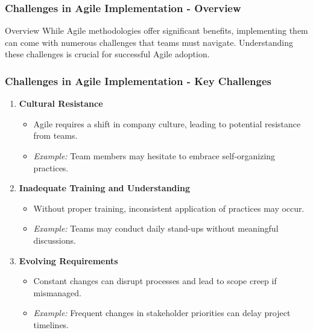 \documentclass{beamer}
\begin{document}
\begin{frame}[fragile]
    \frametitle{Challenges in Agile Implementation - Overview}
    \begin{block}{Overview}
        While Agile methodologies offer significant benefits, implementing them can come with numerous challenges that teams must navigate. Understanding these challenges is crucial for successful Agile adoption.
    \end{block}
\end{frame}

\begin{frame}[fragile]
    \frametitle{Challenges in Agile Implementation - Key Challenges}
    \begin{enumerate}
        \item \textbf{Cultural Resistance}
        \begin{itemize}
            \item Agile requires a shift in company culture, leading to potential resistance from teams.
            \item \textit{Example:} Team members may hesitate to embrace self-organizing practices.
        \end{itemize}

        \item \textbf{Inadequate Training and Understanding}
        \begin{itemize}
            \item Without proper training, inconsistent application of practices may occur.
            \item \textit{Example:} Teams may conduct daily stand-ups without meaningful discussions.
        \end{itemize}

        \item \textbf{Evolving Requirements}
        \begin{itemize}
            \item Constant changes can disrupt processes and lead to scope creep if mismanaged.
            \item \textit{Example:} Frequent changes in stakeholder priorities can delay project timelines.
        \end{itemize}
    \end{enumerate}
\end{frame}
\end{document}
